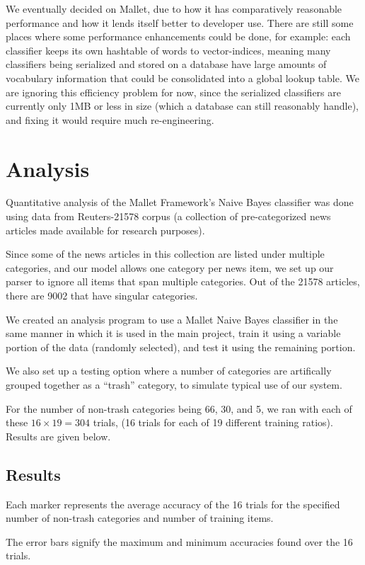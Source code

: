 \documentclass[letterpaper]{article}
\begin{document}
We eventually decided on Mallet, due to how it has comparatively reasonable performance and how it lends itself better to developer use. There are still some places where some performance enhancements could be done, for example: each classifier keeps its own hashtable of words to vector-indices, meaning many classifiers being serialized and stored on a database have large amounts of vocabulary information that could be consolidated into a global lookup table. We are ignoring this efficiency problem for now, since the serialized classifiers are currently only 1MB or less in size (which a database can still reasonably handle), and fixing it would require much re-engineering.

\section{Analysis}
Quantitative analysis of the Mallet Framework's Naive Bayes classifier was done using data from Reuters-21578 corpus \cite{Reuters21578} (a collection of pre-categorized news articles made available for research purposes).

Since some of the news articles in this collection are listed under multiple categories, and our model allows one category per news item, we set up our parser to ignore all items that span multiple categories. Out of the 21578 articles, there are 9002 that have singular categories.

We created an analysis program to use a Mallet Naive Bayes classifier in the same manner in which it is used in the main project, train it using a variable portion of the data (randomly selected), and test it using the remaining portion.

We also set up a testing option where a number of categories are artifically grouped together as a ``trash'' category, to simulate typical use of our system.

For the number of non-trash categories being 66, 30, and 5, we ran with each of these $16\times 19=304$ trials, (16 trials for each of 19 different training ratios). Results are given below.

\subsection{Results}
Each marker represents the average accuracy of the 16 trials for the specified number of non-trash categories and number of training items.

The error bars signify the maximum and minimum accuracies found over the 16 trials.\\
\end{document}
